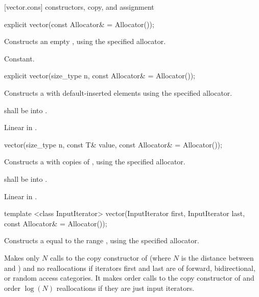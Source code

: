 [vector.cons]{ constructors, copy, and assignment}

\begin{itemdecl}
explicit vector(const Allocator& = Allocator());
\end{itemdecl}

\begin{itemdescr}
\pnum
\effects Constructs an empty , using the
specified allocator.

\pnum
\complexity Constant.
\end{itemdescr}

\begin{itemdecl}
explicit vector(size_type n, const Allocator& = Allocator());
\end{itemdecl}

\begin{itemdescr}
\pnum
\effects Constructs a  with 
default-inserted elements using the specified allocator.

\pnum
\requires {} shall be  into .

\pnum
\complexity Linear in .
\end{itemdescr}

\begin{itemdecl}
vector(size_type n, const T& value,
       const Allocator& = Allocator());
\end{itemdecl}

\begin{itemdescr}
\pnum
\effects Constructs a  with 
copies of , using the specified allocator.

\pnum
\requires {} shall be
 into .

\pnum
\complexity Linear in .
\end{itemdescr}

\begin{itemdecl}
template <class InputIterator>
  vector(InputIterator first, InputIterator last,
         const Allocator& = Allocator());
\end{itemdecl}

\begin{itemdescr}

\pnum
\effects Constructs a  equal to the
range , using the specified allocator.

\pnum
\complexity
Makes only $N$
calls to the copy constructor of
(where $N$
is the distance between
and
)
and no reallocations if iterators first and last are of forward, bidirectional, or random access categories.
It makes order
calls to the copy constructor of
and order
$\log(N)$
reallocations if they are just input iterators.
\end{itemdescr}

